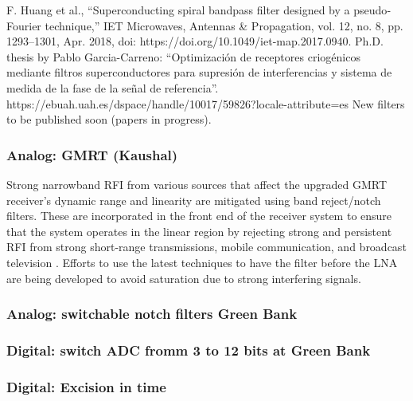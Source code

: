 F. Huang et al., “Superconducting spiral bandpass filter designed by a pseudo‐Fourier technique,” IET Microwaves, Antennas \& Propagation, vol. 12, no. 8, pp. 1293–1301, Apr. 2018, doi: https://doi.org/10.1049/iet-map.2017.0940.
Ph.D. thesis by Pablo Garcia-Carreno: “Optimización de receptores criogénicos mediante filtros superconductores para supresión de interferencias y sistema de medida de la fase de la señal de referencia”. https://ebuah.uah.es/dspace/handle/10017/59826?locale-attribute=es
New filters to be published soon (papers in progress).


\subsubsection{Analog: GMRT (Kaushal)}

Strong narrowband RFI from various sources that affect the upgraded GMRT receiver’s dynamic range and linearity are mitigated using band reject/notch filters. These are incorporated in the front end of the receiver system to ensure that the system operates in the linear region by rejecting strong and persistent RFI from strong short-range transmissions, mobile communication, and broadcast television \cite{sureshkumar2016rfi}. Efforts to use the latest techniques to have the filter before the LNA are being developed to avoid saturation due to strong interfering signals.

\subsubsection{Analog: switchable notch filters Green Bank}
\subsubsection{Digital: switch ADC fromm 3 to 12 bits at Green Bank}

\subsubsection{Digital: Excision in time}

